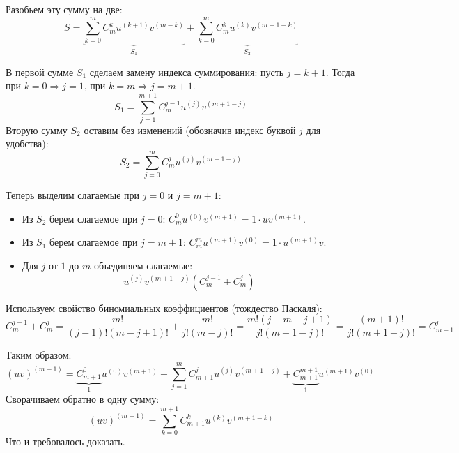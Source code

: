 Разобьем эту сумму на две:
\[ S = \underbrace{\sum_{k=0}^m C_m^k u^{(k+1)} v^{(m-k)}}_{S_1} + \underbrace{\sum_{k=0}^m C_m^k u^{(k)} v^{(m+1-k)}}_{S_2} \]

В первой сумме $S_1$ сделаем замену индекса суммирования: пусть $j = k+1$.
Тогда при $k=0 \Rightarrow j=1$, при $k=m \Rightarrow j=m+1$.
\[ S_1 = \sum_{j=1}^{m+1} C_m^{j-1} u^{(j)} v^{(m+1-j)} \]
Вторую сумму $S_2$ оставим без изменений (обозначив индекс буквой $j$ для удобства):
\[ S_2 = \sum_{j=0}^m C_m^j u^{(j)} v^{(m+1-j)} \]

Теперь выделим слагаемые при $j=0$ и $j=m+1$:
\begin{itemize}
    \item Из $S_2$ берем слагаемое при $j=0$: $C_m^0 u^{(0)} v^{(m+1)} = 1 \cdot u v^{(m+1)}$.
    \item Из $S_1$ берем слагаемое при $j=m+1$: $C_m^m u^{(m+1)} v^{(0)} = 1 \cdot u^{(m+1)} v$.
    \item Для $j$ от $1$ до $m$ объединяем слагаемые:
    \[ u^{(j)} v^{(m+1-j)} \left( C_m^{j-1} + C_m^j \right) \]
\end{itemize}

Используем свойство биномиальных коэффициентов (тождество Паскаля):
\[ C_m^{j-1} + C_m^j = \frac{m!}{(j-1)!(m-j+1)!} + \frac{m!}{j!(m-j)!} = \frac{m!(j + m - j + 1)}{j!(m+1-j)!} = \frac{(m+1)!}{j!(m+1-j)!} = C_{m+1}^j \]

Таким образом:
\[ (uv)^{(m+1)} = \underbrace{C_{m+1}^0}_{1} u^{(0)}v^{(m+1)} + \sum_{j=1}^m C_{m+1}^j u^{(j)} v^{(m+1-j)} + \underbrace{C_{m+1}^{m+1}}_{1} u^{(m+1)}v^{(0)} \]
Сворачиваем обратно в одну сумму:
\[ (uv)^{(m+1)} = \sum_{k=0}^{m+1} C_{m+1}^k u^{(k)} v^{(m+1-k)} \]
Что и требовалось доказать.


